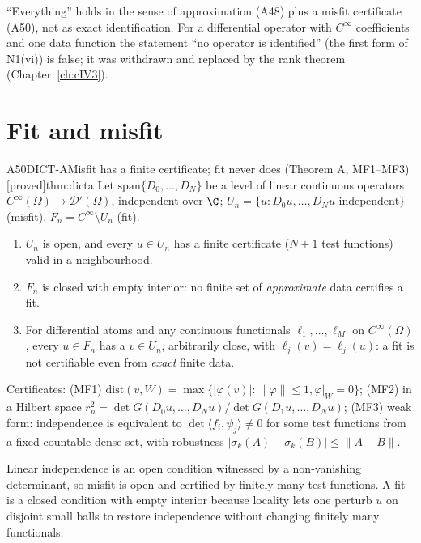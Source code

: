 \documentclass[11pt,a4paper,oneside]{report}
\newcommand{\badge}[2]{\textcolor{#1}{\textsf{\footnotesize[#2]}}}
\newcommand{\proved}{\badge{cC}{proved}}
\newenvironment{dimcard}[5]{\par\Needspace{12\baselineskip}\begin{dimcardbox}{#1}{#2}{#3}{#4}{#5}}{\end{dimcardbox}}
\begin{document}
\begin{caution}[title=What the theorem does not say]
``Everything'' holds in the sense of approximation (A48) plus a misfit certificate (A50), not as exact identification. For a differential operator with $C^\infty$ coefficients and one data function the statement ``no operator is identified'' (the first form of N1(vi)) is false; it was withdrawn and replaced by the rank theorem (Chapter~\ref{ch:cIV3}).
\end{caution}

\section{Fit and misfit}

\begin{dimcard}{A50}{DICT-A}{Misfit has a finite certificate; fit never does (Theorem A, MF1--MF3)}{\proved}{thm:dicta}
Let $\mathrm{span}\{D_0,\dots,D_N\}$ be a level of linear continuous operators $C^\infty(\Omega)\to\mathcal D'(\Omega)$, independent over $\C$; $U_n=\{u:D_0u,\dots,D_Nu\text{ independent}\}$ (misfit), $F_n=C^\infty\setminus U_n$ (fit).
\begin{enumerate}[label=(\roman*)]
\item $U_n$ is open, and every $u\in U_n$ has a finite certificate ($N+1$ test functions) valid in a neighbourhood.
\item $F_n$ is closed with empty interior: no finite set of \emph{approximate} data certifies a fit.
\item For differential atoms and any continuous functionals $\ell_1,\dots,\ell_M$ on $C^\infty(\Omega)$, every $u\in F_n$ has a $v\in U_n$, arbitrarily close, with $\ell_j(v)=\ell_j(u)$: a fit is not certifiable even from \emph{exact} finite data.
\end{enumerate}
Certificates: (MF1) $\mathrm{dist}(v,W)=\max\{|\varphi(v)|:\|\varphi\|\le1,\varphi|_W=0\}$; (MF2) in a Hilbert space $r_n^2=\det G(D_0u,\dots,D_Nu)/\det G(D_1u,\dots,D_Nu)$; (MF3) weak form: independence is equivalent to $\det\langle f_i,\psi_j\rangle\ne0$ for some test functions from a fixed countable dense set, with robustness $|\sigma_k(A)-\sigma_k(B)|\le\|A-B\|$.
\end{dimcard}

\begin{proofidea}
Linear independence is an open condition witnessed by a non-vanishing determinant, so misfit is open and certified by finitely many test functions. A fit is a closed condition with empty interior because locality lets one perturb $u$ on disjoint small balls to restore independence without changing finitely many functionals.
\end{proofidea}
\end{document}
